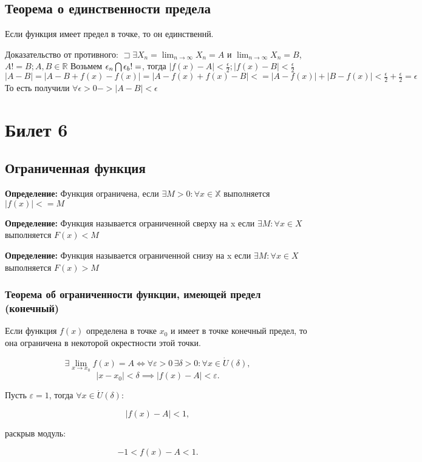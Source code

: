 \documentclass{article}
\begin{document}
\subsection{Теорема о единственности предела} 
Если функция имеет предел в точке, то он единственнй.

Доказательство от противного:
$\sqsupset \exists {X_n} = \lim_{n \to \infty}{X_n} = A$ и $\lim_{n \to \infty}{X_n} = B$, $A != B; A,B \in \mathds{R}$
Возьмем $\epsilon_n \bigcap \epsilon_b != \empty$, тогда $|f(x) - A| < \frac{\epsilon}{2}; |f(x) - B| < \frac{\epsilon}{2}$
$|A-B| = |A-B+f(x)-f(x)| = |A-f(x)+f(x)-B| <= |A-f(x)| + |B-f(x)| < \frac{\epsilon}{2} + \frac{\epsilon}{2} = \epsilon$
То есть получили $\forall \epsilon > 0 -> |A-B| < \epsilon$

\section{Билет 6}

\subsection{Ограниченная функция}

\textbf{Определение:} Функция ограничена, если $\exists M > 0 : \forall x \in \mathds{X}$ выполняется $|f(x)| <= M$

\textbf{Определение:} Функция называется ограниченной сверху на x если $\exists M : \forall x \in X$ выполняется $F(x)<M$

\textbf{Определение:} Функция называется ограниченной снизу на x если $\exists M : \forall x \in X$ выполняется $F(x)>M$

\subsubsection{Теорема об ограниченности функции, имеющей предел (конечный)}
Если функция $f(x)$ определена в точке $x_0$ и имеет в точке конечный предел, то она ограничена в некоторой окрестности этой точки.

\[
\exists \lim_{x \to x_0} f(x) = A \iff \forall \varepsilon > 0 \, \exists \delta > 0 : \forall x \in \dot{U}(\delta),
\]
\[ 
|x - x_0| < \delta \implies |f(x) - A| < \varepsilon.
\]

Пусть $\varepsilon = 1$, тогда $\forall x \in \dot{U}(\delta)$:

\[
|f(x) - A| < 1,
\]

раскрыв модуль:

\[
-1 < f(x) - A < 1.
\]
\end{document}
